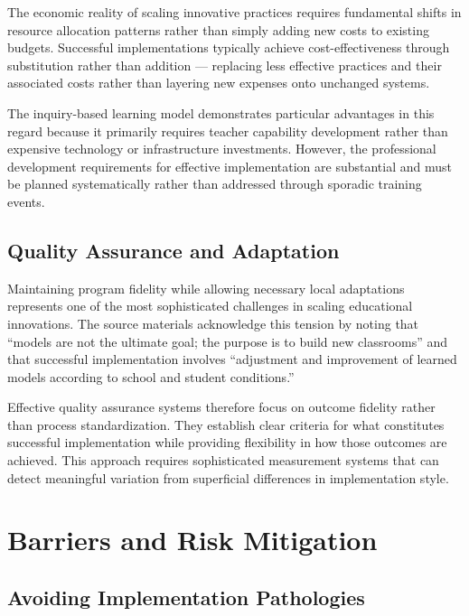 \documentclass[
  Letterpaper,
]{scrbook}
\begin{document}
The economic reality of scaling innovative practices requires
fundamental shifts in resource allocation patterns rather than simply
adding new costs to existing budgets. Successful implementations
typically achieve cost-effectiveness through substitution rather than
addition --- replacing less effective practices and their associated
costs rather than layering new expenses onto unchanged systems.

The inquiry-based learning model demonstrates particular advantages in
this regard because it primarily requires teacher capability development
rather than expensive technology or infrastructure investments. However,
the professional development requirements for effective implementation
are substantial and must be planned systematically rather than addressed
through sporadic training events.

\subsection{Quality Assurance and
Adaptation}\label{quality-assurance-and-adaptation}

Maintaining program fidelity while allowing necessary local adaptations
represents one of the most sophisticated challenges in scaling
educational innovations. The source materials acknowledge this tension
by noting that ``models are not the ultimate goal; the purpose is to
build new classrooms'' and that successful implementation involves
``adjustment and improvement of learned models according to school and
student conditions.''

Effective quality assurance systems therefore focus on outcome fidelity
rather than process standardization. They establish clear criteria for
what constitutes successful implementation while providing flexibility
in how those outcomes are achieved. This approach requires sophisticated
measurement systems that can detect meaningful variation from
superficial differences in implementation style.

\section{Barriers and Risk
Mitigation}\label{barriers-and-risk-mitigation}

\subsection{Avoiding Implementation
Pathologies}\label{avoiding-implementation-pathologies}
\end{document}

